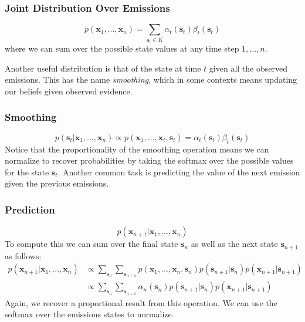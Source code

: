 \subsubsection{Joint Distribution Over Emissions}
\begin{equation} \label{joint-fn}
	p(\textbf{x}_1, ..., \textbf{x}_n) = \sum_{\textbf{s}_t \in K} \alpha_t(\textbf{s}_t) \beta_t(\textbf{s}_t)
\end{equation}
where we can sum over the possible state values at any time step $1,...,n$.

Another useful distribution is that of the state at time $t$ given all the observed emissions. This has the name \textit{smoothing}, which in some contexts means updating our beliefs given observed evidence.

\subsubsection{Smoothing}
\begin{equation} \label{smoothing-fn}
	p(\textbf{s}_t | \textbf{x}_1, ..., \textbf{x}_n) \propto p(\textbf{x}_1, ..., \textbf{x}_t, \textbf{s}_t) = \alpha_t(\textbf{s}_t) \beta_t(\textbf{s}_t)
\end{equation}
Notice that the proportionality of the smoothing operation means we can normalize to recover probabilities by taking the softmax over the possible values for the state $\textbf{s}_t$. \newline \newline
Another common task is predicting the value of the next emission given the previous emissions.

\subsubsection{Prediction}
\begin{equation} \label{prediction-fn}
	p(\textbf{x}_{n+1} | \textbf{x}_1, ..., \textbf{x}_n)
\end{equation}
To compute this we can sum over the final state $\textbf{s}_n$ as well as the next state $\textbf{s}_{n+1}$ as follows:
\begin{align}
	p(\textbf{x}_{n+1} | \textbf{x}_1, ..., \textbf{x}_n) &\propto \sum_{\textbf{s}_n} \sum_{\textbf{s}_{n+1}} p(\textbf{x}_1, ..., \textbf{x}_n, \textbf{s}_n) p(\textbf{s}_{n+1} | \textbf{s}_n) p(\textbf{x}_{n+1} | \textbf{s}_{n+1}) \\
	&\propto \sum_{\textbf{s}_n} \sum_{\textbf{s}_{n+1}} \alpha_{n}(\textbf{s}_n) p(\textbf{s}_{n+1} | \textbf{s}_n) p(\textbf{x}_{n+1} | \textbf{s}_{n+1})
\end{align}
Again, we recover a proportional result from this operation. We can use the softmax over the emissions states to normalize.

